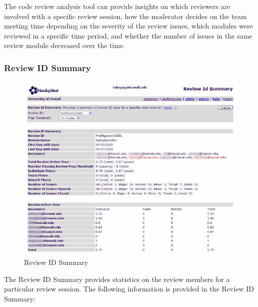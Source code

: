 The code review analysis tool can provide insights on which reviewers are involved with a specific review session, how the moderator decides on the team meeting time depending on the severity of the review issues, which modules were reviewed in a specific time period, and whether the number of issues in the same review module decreased over the time.

\subsubsection{Review ID Summary}
\label{subsec:review-id-summary}

\begin{figure}[htbp]
  \centering
  \includegraphics{images/fig6-1.eps}
  \caption{Review ID Summary}
  \label{fig6-1}
\end{figure}

The Review ID Summary provides statistics on the review members for a particular review session. The following information is provided in the Review ID Summary:

